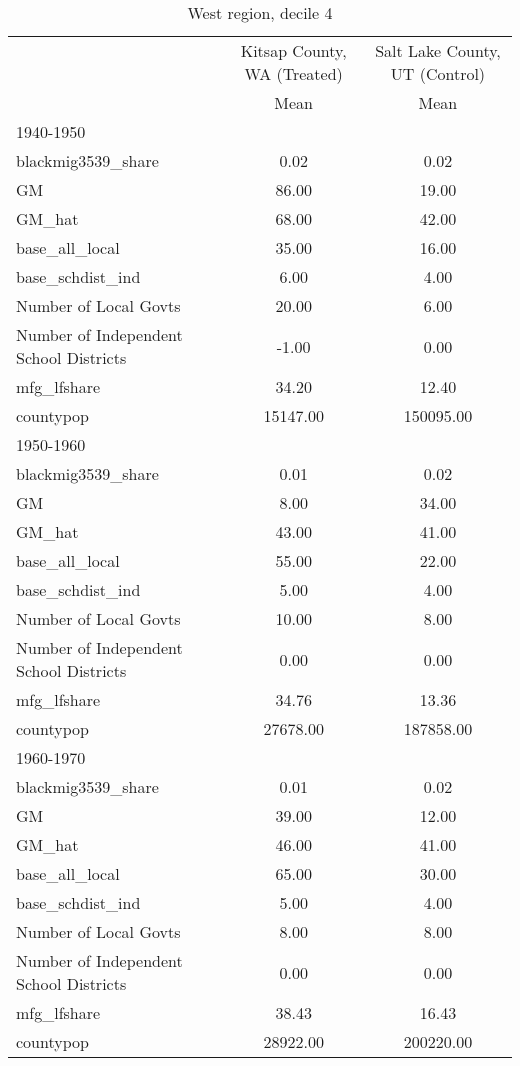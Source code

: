 \begin{table}[htbp]\centering
\def\sym#1{\ifmmode^{#1}\else\(^{#1}\)\fi}
\caption{West region, decile 4 \label{tab1}}
\begin{tabular}{l*{2}{c}}
\toprule
                    &\multicolumn{1}{c}{Kitsap County, WA (Treated)}&\multicolumn{1}{c}{Salt Lake County, UT (Control)}\\
                    &        Mean&        Mean\\
\midrule
1940-1950           &            &            \\
blackmig3539\_share  &        0.02&        0.02\\
GM                  &       86.00&       19.00\\
GM\_hat              &       68.00&       42.00\\
base\_all\_local      &       35.00&       16.00\\
base\_schdist\_ind    &        6.00&        4.00\\
Number of Local Govts&       20.00&        6.00\\
Number of Independent School Districts&       -1.00&        0.00\\
mfg\_lfshare         &       34.20&       12.40\\
countypop           &    15147.00&   150095.00\\
\midrule
1950-1960           &            &            \\
blackmig3539\_share  &        0.01&        0.02\\
GM                  &        8.00&       34.00\\
GM\_hat              &       43.00&       41.00\\
base\_all\_local      &       55.00&       22.00\\
base\_schdist\_ind    &        5.00&        4.00\\
Number of Local Govts&       10.00&        8.00\\
Number of Independent School Districts&        0.00&        0.00\\
mfg\_lfshare         &       34.76&       13.36\\
countypop           &    27678.00&   187858.00\\
\midrule
1960-1970           &            &            \\
blackmig3539\_share  &        0.01&        0.02\\
GM                  &       39.00&       12.00\\
GM\_hat              &       46.00&       41.00\\
base\_all\_local      &       65.00&       30.00\\
base\_schdist\_ind    &        5.00&        4.00\\
Number of Local Govts&        8.00&        8.00\\
Number of Independent School Districts&        0.00&        0.00\\
mfg\_lfshare         &       38.43&       16.43\\
countypop           &    28922.00&   200220.00\\
\bottomrule
\end{tabular}
\end{table}
